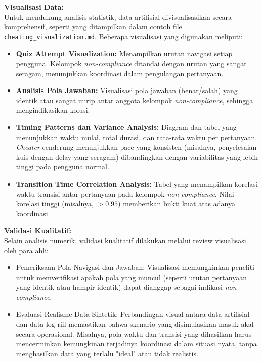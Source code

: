 \textbf{Visualisasi Data:} \\
Untuk mendukung analisis statistik, data artifisial divisualisasikan secara komprehensif, seperti yang ditampilkan dalam contoh file \texttt{cheating\_visualization.md}. Beberapa visualisasi yang digunakan meliputi:
\begin{itemize}
    \item \textbf{Quiz Attempt Visualization:} Menampilkan urutan navigasi setiap pengguna. Kelompok \textit{non-compliance} ditandai dengan urutan yang sangat seragam, menunjukkan koordinasi dalam pengulangan pertanyaan.
    \item \textbf{Analisis Pola Jawaban:} Visualisasi pola jawaban (benar/salah) yang identik atau sangat mirip antar anggota kelompok \textit{non-compliance}, sehingga mengindikasikan kolusi.
    \item \textbf{Timing Patterns dan Variance Analysis:} Diagram dan tabel yang menunjukkan waktu mulai, total durasi, dan rata-rata waktu per pertanyaan. \textit{Cheater} cenderung menunjukkan pace yang konsisten (misalnya, penyelesaian kuis dengan delay yang seragam) dibandingkan dengan variabilitas yang lebih tinggi pada pengguna normal.
    \item \textbf{Transition Time Correlation Analysis:} Tabel yang menampilkan korelasi waktu transisi antar pertanyaan pada kelompok \textit{non-compliance}. Nilai korelasi tinggi (misalnya, $>0.95$) memberikan bukti kuat atas adanya koordinasi.
\end{itemize}

\textbf{Validasi Kualitatif:} \\
Selain analisis numerik, validasi kualitatif dilakukan melalui review visualisasi oleh para ahli:
\begin{itemize}
    \item Pemeriksaan Pola Navigasi dan Jawaban: Visualisasi memungkinkan peneliti untuk memverifikasi apakah pola yang muncul (seperti urutan pertanyaan yang identik atau hampir identik) dapat dianggap sebagai indikasi \textit{non-compliance}.
    \item Evaluasi Realisme Data Sintetik: Perbandingan visual antara data artifisial dan data log riil memastikan bahwa skenario yang disimulasikan masuk akal secara operasional. Misalnya, pola waktu dan transisi yang dihasilkan harus mencerminkan kemungkinan terjadinya koordinasi dalam situasi nyata, tanpa menghasilkan data yang terlalu "ideal" atau tidak realistis.
\end{itemize}

